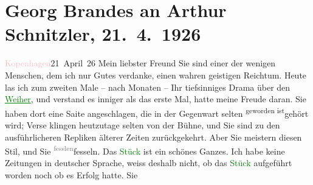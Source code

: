 

               \section[Georg Brandes an Arthur Schnitzler, 21. 4. 1926]{ Georg Brandes an Arthur Schnitzler, 21. 4. 1926}\nopagebreak{}\rehead{ }\normalsize\beginnumbering{} \toendnotes[C]{\smallbreak\pagebreak[2]} 
\toendnotes[C]{\smallbreak}\pstart
           \raggedleft{}{\pb}\textcolor{pink}{Kopenhagen}{}\ledrightnote{\textcolor{pink}{Kopenhagen}}{ }21 April 26\pend
           \pstart
           Mein liebster Freund Sie sind einer der wenigen Menschen, dem
                    ich nur Gutes verdanke, einen wahren geistigen Reichtum. Heute las ich zum
                    zweiten Male – nach Monaten – Ihr tiefsinniges Drama über den \textcolor{green}{\uline{Weiher}}{}\ledrightnote{\textcolor{green}{Der Gang zum Weiher. Dramatische Dichtung}}, und verstand es inniger als das erste Mal, hatte meine Freude daran. Sie
                    haben dort eine Saite angeschlagen, die in der Gegenwart selten \substVorne{}\textsuperscript{geworden ist}{\allowbreak}\substDazwischen{}gehört wird\substHinten{}; Verse klingen heutzutage selten von der Bühne, und Sie sind zu den
                    ausführlicheren Repliken älterer Zeiten zurückgekehrt. Aber Sie meistern diesen
                    Stil, und Sie \substVorne{}\textsuperscript{\textcolor{gray}{fesslen}}{\allowbreak}\substDazwischen{}fesseln\substHinten{}. Das \textcolor{green}{Stück}{} ist ein
                    schönes Ganzes.\pend
           \pstart
           {\pb}Ich habe keine Zeitungen in
                    deutscher Sprache, weiss deshalb nicht, ob das \textcolor{green}{Stück}{} aufgeführt worden noch ob es Erfolg hatte. Sie
